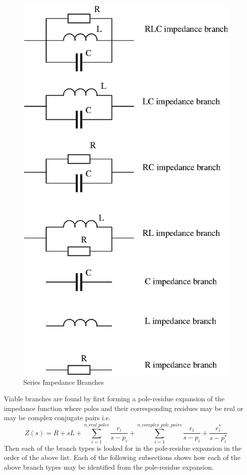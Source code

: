 \begin{figure}[ht]
\centering
\includegraphics[scale=0.7]{./Imgs/series_impedance_branches.eps}
\caption{Series Impedance Branches}
\label{fig:series_impedance_branches}
\end{figure}
%
Viable branches are found by first forming a pole-residue expansion of the impedance function where poles and their corresponding residues may be real or may be complex conjugate pairs i.e. 
%
\begin{equation} \label{eq:rational_function_Z}
Z\left(s\right)=R+sL+\sum_{i=1}^{n\_real\_poles} \frac{r_i}{s-p_i} + 
                           \sum_{i=1}^{n\_complex\_pole\_pairs} \frac{r_i}{s-p_i}+\frac{r_i^*}{s-p_i^*}
\end{equation}
%
Then each of the branch types is looked for in the pole-residue expansion in the order of the above list. Each of the following subsections shows how each of the above branch types may be identified from the pole-residue expansion.

